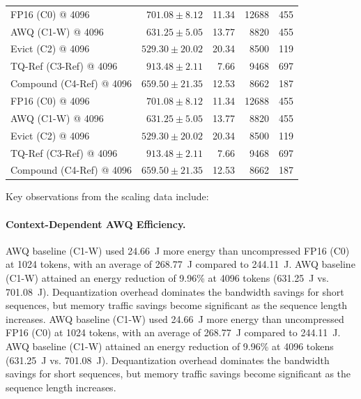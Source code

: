 \documentclass[sigconf,nonacm]{acmart}
\begin{document}
\begin{table}[htbp]
{\begin{tabular}{@{}lrrrr@{}}
\midrule
FP16 (C0) @ 4096        & $701.08 \pm 8.12$  & 11.34 & 12688 & 455 \\
AWQ (C1-W) @ 4096       & $631.25 \pm 5.05$  & 13.77 & 8820  & 455 \\
Evict (C2) @ 4096       & $529.30 \pm 20.02$ & 20.34 & 8500  & 119 \\
TQ-Ref (C3-Ref) @ 4096  & $913.48 \pm 2.11$  & 7.66  & 9468  & 697 \\
Compound (C4-Ref) @ 4096& $659.50 \pm 21.35$ & 12.53 & 8662  & 187 \\
FP16 (C0) @ 4096        & $701.08 \pm 8.12$  & 11.34 & 12688 & 455 \\
AWQ (C1-W) @ 4096       & $631.25 \pm 5.05$  & 13.77 & 8820  & 455 \\
Evict (C2) @ 4096       & $529.30 \pm 20.02$ & 20.34 & 8500  & 119 \\
TQ-Ref (C3-Ref) @ 4096  & $913.48 \pm 2.11$  & 7.66  & 9468  & 697 \\
Compound (C4-Ref) @ 4096& $659.50 \pm 21.35$ & 12.53 & 8662  & 187 \\
\bottomrule
\end{tabular}}
\end{table}

Key observations from the scaling data include:

\paragraph{Context-Dependent AWQ Efficiency.}
AWQ baseline (C1-W) used 24.66~J more energy than uncompressed FP16 (C0) at 1024 tokens, with an average of 268.77~J compared to 244.11~J. AWQ baseline (C1-W) attained an energy reduction of 9.96\% at 4096 tokens (631.25~J vs. 701.08~J). Dequantization overhead dominates the bandwidth savings for short sequences, but memory traffic savings become significant as the sequence length increases.
AWQ baseline (C1-W) used 24.66~J more energy than uncompressed FP16 (C0) at 1024 tokens, with an average of 268.77~J compared to 244.11~J. AWQ baseline (C1-W) attained an energy reduction of 9.96\% at 4096 tokens (631.25~J vs. 701.08~J). Dequantization overhead dominates the bandwidth savings for short sequences, but memory traffic savings become significant as the sequence length increases.
\end{document}
